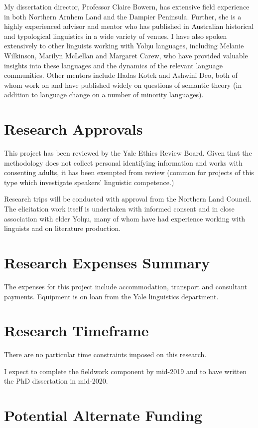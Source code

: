 \documentclass[12pt]{article}
\begin{document}
My dissertation director, Professor Claire Bowern, has extensive field experience in both Northern Arnhem Land and the Dampier Peninsula. Further, she is a highly experienced advisor and mentor who has published in Australian historical and typological linguistics in a wide variety of venues. I have also spoken extensively to other linguists working with Yolŋu languages, including Melanie Wilkinson, Marilyn McLellan and Margaret Carew, who have provided valuable insights into these languages and the dynamics of the relevant language communities. Other mentors include Hadas Kotek and Ashwini Deo, both of whom work on and have published widely on questions of semantic theory (in addition to language change on a number of minority languages).

\section{Research Approvals}

This project has been reviewed by the Yale Ethics Review Board. Given that the methodology does not collect personal identifying information and works with consenting adults, it has been exempted from review (common for projects of this type which investigate speakers' linguistic competence.)

Research trips will be conducted with approval from the Northern Land Council. The elicitation work itself is undertaken with informed consent and in close association with elder Yolŋu, many of whom have had experience working with linguists and on literature production. 

\section{Research Expenses Summary}

The expenses for this project include accommodation, transport and consultant payments. Equipment is on loan from the Yale linguistics department.

\section{Research Timeframe}

There are no particular time constraints imposed on this research.

I expect to complete the fieldwork component by mid-2019 and to have written the PhD dissertation in mid-2020.

\section{Potential Alternate Funding}
\end{document}
